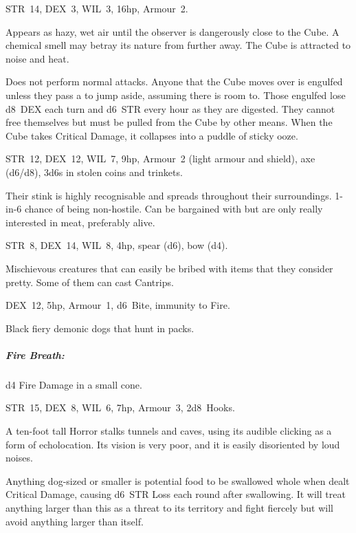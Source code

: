 \documentclass[itdr]{subfiles}
\begin{document}
\vfill

STR~14, DEX~3, WIL~3, 16hp, Armour~2.

Appears as hazy, wet air until the observer is dangerously close to the Cube. A chemical smell may betray its nature from further away. The Cube is
attracted to noise and heat.

Does not perform normal attacks. Anyone that the Cube moves over is engulfed unless they pass a  to jump aside, assuming there is room to. Those engulfed lose d8~DEX each turn and d6~STR every hour as they are digested. They cannot free themselves but must be pulled from the Cube by other means. When the Cube takes Critical Damage, it collapses into a puddle of sticky ooze.

\vfill

STR~12, DEX~12, WIL~7, 9hp, Armour~2 (light armour and shield), axe (d6/d8), 3d6s in stolen coins and trinkets.

Their stink is highly recognisable and spreads throughout their surroundings.
1-in-6 chance of being non-hostile. Can be bargained with but are only really interested in meat, preferably alive.

\vfill
\break

STR~8, DEX~14, WIL~8, 4hp, spear (d6), bow (d4).

Mischievous creatures that can easily be bribed with items that they consider pretty. Some of them can cast Cantrips.

\vfill

DEX~12, 5hp, Armour~1, d6~Bite, immunity to Fire.

Black fiery demonic dogs that hunt in packs.

\subparagraph{Fire Breath:} d4 Fire Damage in a small cone.

\vfill

STR~15, DEX~8, WIL~6, 7hp, Armour~3, 2d8~Hooks.

A ten-foot tall Horror stalks tunnels and caves, using its audible clicking as a form of echolocation. Its vision is very poor, and it is easily disoriented by loud noises.

Anything dog-sized or smaller is potential food to be swallowed whole when dealt Critical Damage, causing d6~STR Loss each round after swallowing. It will treat anything larger than this as a threat to its territory and fight fiercely but will avoid anything larger than itself.
\end{document}
